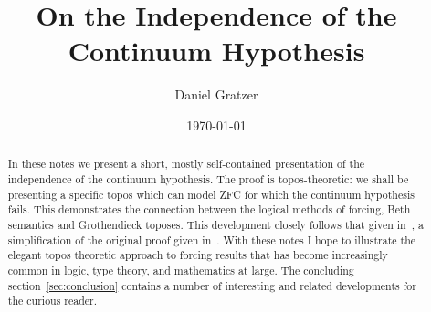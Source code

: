 \documentclass[12pt]{amsart}
\title{On the Independence of the Continuum Hypothesis}
\author{Daniel Gratzer}
\date{\today}
\begin{document}
\begin{abstract}
  In these notes we present a short, mostly self-contained
  presentation of the independence of the continuum hypothesis. The
  proof is topos-theoretic: we shall be presenting a specific topos
  which can model ZFC for which the continuum hypothesis fails. This
  demonstrates the connection between the logical methods of forcing,
  Beth semantics and Grothendieck toposes. This development closely
  follows that given in~\citet{MacLane:92}, a simplification of the
  original proof given in~\citet{Cohen:63}. With these notes I hope to
  illustrate the elegant topos theoretic approach to forcing results
  that has become increasingly common in logic, type theory, and
  mathematics at large. The concluding section~\ref{sec:conclusion}
  contains a number of interesting and related developments for the
  curious reader.
\end{abstract}
\maketitle








{}
\end{document}

